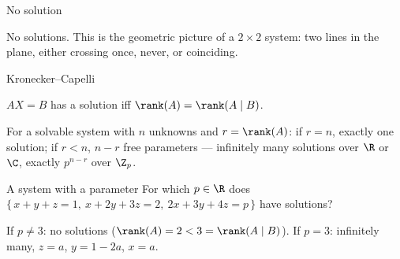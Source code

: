 \begin{frame}{No solution}
\begin{steps}
\end{steps}

\pause

No solutions. This is the geometric picture of a $2\times 2$ system: two lines in the plane, either
crossing once, never, or coinciding.

\pause

\end{frame}

\begin{frame}{Kronecker--Capelli}
\begin{theorem}
$AX=B$ has a solution iff $\rank(A)=\rank(A\mid B)$.
\end{theorem}

\pause

\begin{corollary}
For a solvable system with $n$ unknowns and $r=\rank(A)$: if $r=n$, exactly one solution; if $r<n$, $n-r$
free parameters — infinitely many solutions over $\R$ or $\C$, exactly $p^{n-r}$ over $\Z_p$.
\end{corollary}
\end{frame}

\begin{frame}{A system with a parameter}
For which $p\in\R$ does $\{\,x+y+z=1,\ x+2y+3z=2,\ 2x+3y+4z=p\,\}$ have solutions?

\pause

\begin{steps}
\end{steps}

\pause

If $p\neq 3$: no solutions ($\rank(A)=2 < 3 = \rank(A\mid B)$). If $p=3$: infinitely many, $z=a$,
$y=1-2a$, $x=a$.
\end{frame}

